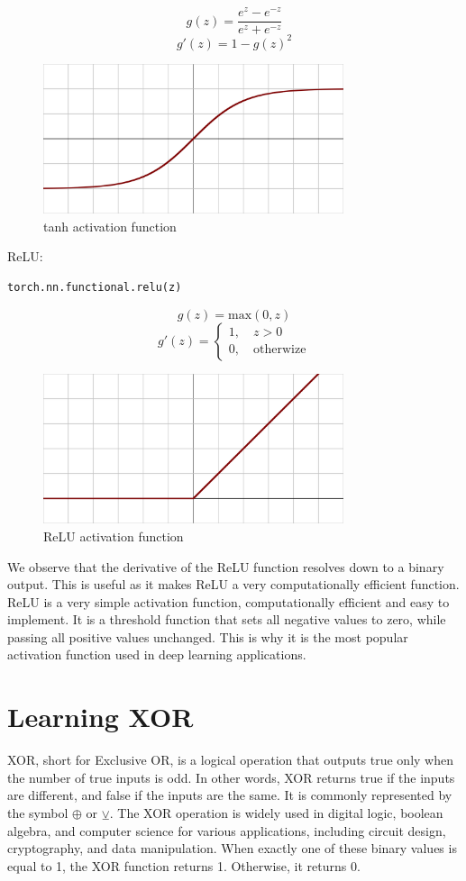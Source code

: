 \documentclass{report}
\begin{document}
$$g(z) = \frac{e^z - e^{-z}}{e^z + e^{-z}}$$
$$g'(z) = 1 - g(z)^2$$

\begin{figure}[ht]
	\includegraphics[width=250pt]{3}
	\centering
	\caption{tanh activation function}
\end{figure}

ReLU:
\begin{verbatim}
torch.nn.functional.relu(z)
\end{verbatim}

$$g(z) = \textrm{max}(0,z)$$
$$g'(z) =
\begin{cases}
	1, \quad z>0\\
	0, \quad \textrm{otherwize}
\end{cases}$$

\begin{figure}[ht]
	\includegraphics[width=250pt]{4}
	\centering
	\caption{ReLU activation function}
\end{figure}


We observe that the derivative of the ReLU function resolves down to a binary output. This is useful as it makes ReLU a very computationally efficient function. ReLU is a very simple activation function, computationally efficient and easy to implement. It is a threshold function that sets all negative values to zero, while passing all positive values unchanged. This is why it is the most popular activation function used in deep learning applications.

\section{Learning XOR}
XOR, short for Exclusive OR, is a logical operation that outputs true only when the number of true inputs is odd. In other words, XOR returns true if the inputs are different, and false if the inputs are the same. It is commonly represented by the symbol \(\oplus\) or \(\veebar\). The XOR operation is widely used in digital logic, boolean algebra, and computer science for various applications, including circuit design, cryptography, and data manipulation. When exactly one of these binary values is equal to 1, the XOR function returns 1. Otherwise, it returns 0.
\end{document}
